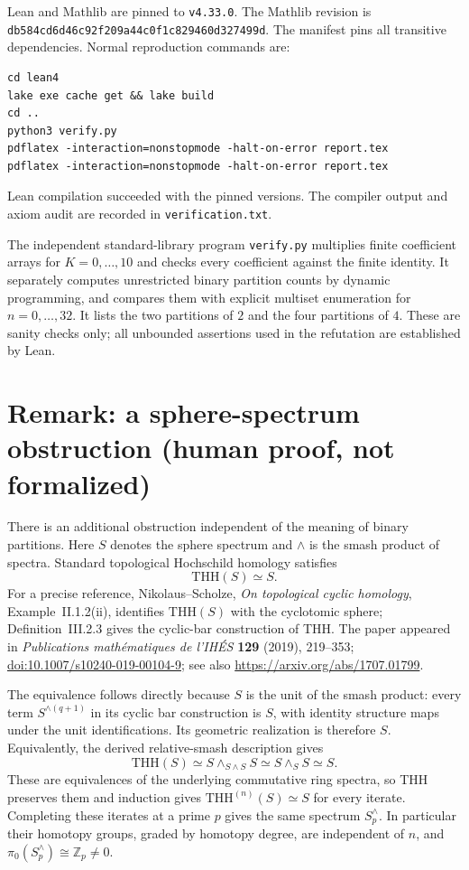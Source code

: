 \documentclass[11pt]{article}
\begin{document}
{\raggedright
Lean and Mathlib are pinned to \texttt{v4.33.0}. The Mathlib revision is \texttt{db584cd6d46c92f209a44c0f1c829460d327499d}. The manifest pins all transitive dependencies. Normal reproduction commands are:\par}
\begin{lstlisting}
cd lean4
lake exe cache get && lake build
cd ..
python3 verify.py
pdflatex -interaction=nonstopmode -halt-on-error report.tex
pdflatex -interaction=nonstopmode -halt-on-error report.tex
\end{lstlisting}
Lean compilation succeeded with the pinned versions. The compiler output and axiom audit are recorded in \texttt{verification.txt}.

The independent standard-library program \texttt{verify.py} multiplies finite coefficient arrays for $K=0,\ldots,10$ and checks every coefficient against the finite identity. It separately computes unrestricted binary partition counts by dynamic programming, and compares them with explicit multiset enumeration for $n=0,\ldots,32$. It lists the two partitions of $2$ and the four partitions of $4$. These are sanity checks only; all unbounded assertions used in the refutation are established by Lean.

\section{Remark: a sphere-spectrum obstruction (human proof, not formalized)}
There is an additional obstruction independent of the meaning of binary
partitions. Here $S$ denotes the sphere spectrum and $\wedge$ is the
smash product of spectra. Standard topological Hochschild homology
satisfies
\[
\mathrm{THH}(S)\simeq S.
\]
For a precise reference, Nikolaus--Scholze, \emph{On topological cyclic
homology}, Example~II.1.2(ii), identifies $\mathrm{THH}(S)$ with the
cyclotomic sphere; Definition~III.2.3 gives the cyclic-bar construction
of THH. The paper appeared in \emph{Publications math\'ematiques de
l'IH\'ES} \textbf{129} (2019), 219--353;
\href{https://doi.org/10.1007/s10240-019-00104-9}
{doi:10.1007/s10240-019-00104-9}; see also
\url{https://arxiv.org/abs/1707.01799}.

The equivalence follows directly because $S$ is the unit of the smash
product: every term $S^{\wedge(q+1)}$ in its cyclic bar construction
is $S$, with identity structure maps under the unit identifications.
Its geometric realization is therefore $S$. Equivalently, the derived
relative-smash description gives
\[
\mathrm{THH}(S)\simeq S\wedge_{S\wedge S}S
\simeq S\wedge_S S\simeq S.
\]
These are equivalences of the underlying commutative ring spectra, so
THH preserves them and induction gives $\mathrm{THH}^{(n)}(S)\simeq S$
for every iterate. Completing these iterates at a prime $p$ gives the
same spectrum $S^\wedge_p$. In particular their homotopy groups, graded
by homotopy degree, are independent of $n$, and
$\pi_0(S^\wedge_p)\cong\mathbb Z_p\ne0$.
\end{document}
